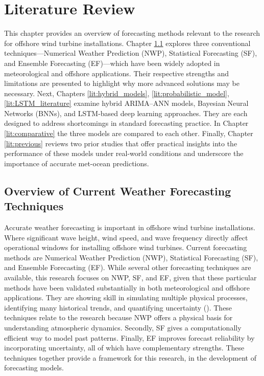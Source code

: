 \chapter{Literature Review}
This chapter provides an overview of forecasting methods relevant to the research for offshore wind turbine installations. Chapter \ref{lit:overview} explores three conventional techniques—Numerical Weather Prediction (NWP), Statistical Forecasting (SF), and Ensemble Forecasting (EF)—which have been widely adopted in meteorological and offshore applications. Their respective strengths and limitations are presented to highlight why more advanced solutions may be necessary. Next, Chapters \ref{lit:hybrid_models}, \ref{lit:probabilistic_model}, \ref{lit:LSTM_literature} examine hybrid ARIMA–ANN models, Bayesian Neural Networks (BNNs), and LSTM-based deep learning approaches. They are each designed to address shortcomings in standard forecasting practice. In Chapter \ref{lit:comparative} the three models are compared to each other. Finally, Chapter \ref{lit:previous} reviews two prior studies \cite{boer2022installation, overvliet2023uncertainty} that offer practical insights into the performance of these models under real-world conditions and underscore the importance of accurate met-ocean predictions.

\section{Overview of Current Weather Forecasting Techniques}
\label{lit:overview}
Accurate weather forecasting is important in offshore wind turbine installations. Where significant wave height, wind speed, and wave frequency directly affect operational windows for installing offshore wind turbines. Current forecasting methods are Numerical Weather Prediction (NWP), Statistical Forecasting (SF), and Ensemble Forecasting (EF). While several other forecasting techniques are available, this research focuses on NWP, SF, and EF, given that these particular methods have been validated substantially in both meteorological and offshore applications. They are showing skill in simulating multiple physical processes, identifying many historical trends, and quantifying uncertainty (\cite{box2015time, leutbecher2008ensemble}). These techniques relate to the research because NWP offers a physical basis for understanding atmospheric dynamics. Secondly, SF gives a computationally efficient way to model past patterns. Finally, EF improves forecast reliability by incorporating uncertainty, all of which have complementary strengths. These techniques together provide a framework for this research, in the development of forecasting models.

